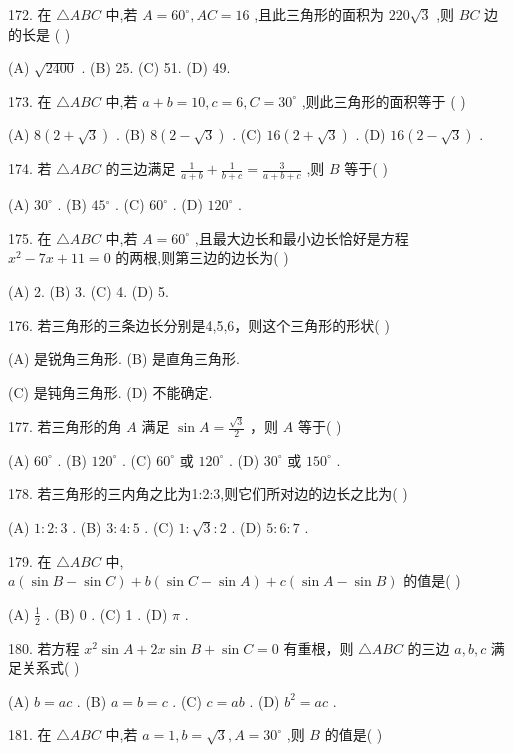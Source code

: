 \documentclass[10pt]{article}
\begin{document}
172. 在 \(\bigtriangleup {ABC}\) 中,若 \(A = {60}^{ \circ  },{AC} = {16}\) ,且此三角形的面积为 \({220}\sqrt{3}\) ,则 \({BC}\) 边的长是 ( )

(A) \(\sqrt{2400}\) . (B) 25. (C) 51. (D) 49.

173. 在 \(\bigtriangleup {ABC}\) 中,若 \(a + b = {10},c = 6,C = {30}^{ \circ  }\) ,则此三角形的面积等于 ( )

(A) \(8\left( {2 + \sqrt{3}}\right)\) . (B) \(8\left( {2 - \sqrt{3}}\right)\) . (C) \({16}\left( {2 + \sqrt{3}}\right)\) . (D) \({16}\left( {2 - \sqrt{3}}\right)\) .

174. 若 \(\bigtriangleup {ABC}\) 的三边满足 \(\frac{1}{a + b} + \frac{1}{b + c} = \frac{3}{a + b + c}\) ,则 \(B\) 等于( )

(A) \({30}^{ \circ  }\) . (B) \({45}{}^{ \circ  }\) . (C) \({60}^{ \circ  }\) . (D) \({120}^{ \circ  }\) .

175. 在 \(\bigtriangleup {ABC}\) 中,若 \(A = {60}^{ \circ  }\) ,且最大边长和最小边长恰好是方程 \({x}^{2} - {7x} + {11} = 0\) 的两根,则第三边的边长为( )

(A) 2. (B) 3. (C) 4. (D) 5.

176. 若三角形的三条边长分别是4,5,6，则这个三角形的形状( )

(A) 是锐角三角形. (B) 是直角三角形.

(C) 是钝角三角形. (D) 不能确定.

177. 若三角形的角 \(A\) 满足 \(\sin A = \frac{\sqrt{3}}{2}\) ，则 \(A\) 等于( )

(A) \({60}^{ \circ  }\) . (B) \({120}^{ \circ  }\) . (C) \({60}^{ \circ  }\) 或 \({120}^{ \circ  }\) . (D) \({30}^{ \circ  }\) 或 \({150}^{ \circ  }\) .

178. 若三角形的三内角之比为1:2:3,则它们所对边的边长之比为( )

(A) \(1 : 2 : 3\) . (B) \(3 : 4 : 5\) . (C) \(1 : \sqrt{3} : 2\) . (D) \(5 : 6 : 7\) .

179. 在 \(\bigtriangleup {ABC}\) 中, \(a\left( {\sin B - \sin C}\right)  + b\left( {\sin C - \sin A}\right)  + c\left( {\sin A - \sin B}\right)\) 的值是( )

(A) \(\frac{1}{2}\) . (B) 0 . (C) 1 . (D) \(\pi\) .

180. 若方程 \({x}^{2}\sin A + {2x}\sin B + \sin C = 0\) 有重根，则 \(\bigtriangleup  {ABC}\) 的三边 \(a,b,c\) 满足关系式( )

(A) \(b = {ac}\) . (B) \(a = b = c\) . (C) \(c = {ab}\) . (D) \({b}^{2} = {ac}\) .

181. 在 \(\bigtriangleup {ABC}\) 中,若 \(a = 1,b = \sqrt{3},A = {30}^{ \circ  }\) ,则 \(B\) 的值是( )
\end{document}
